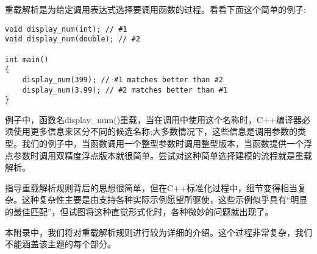 重载解析是为给定调用表达式选择要调用函数的过程。看看下面这个简单的例子:

\begin{lstlisting}[style=styleCXX]
void display_num(int); // #1
void display_num(double); // #2

int main()
{
	display_num(399); // #1 matches better than #2
	display_num(3.99); // #2 matches better than #1
}
\end{lstlisting}

例子中，函数名display\_num()重载，当在调用中使用这个名称时，C++编译器必须使用更多信息来区分不同的候选名称;大多数情况下，这些信息是调用参数的类型。我们的例子中，当函数调用一个整型参数时调用整型版本，当函数提供一个浮点参数时调用双精度浮点版本就很简单。尝试对这种简单选择建模的流程就是重载解析。

指导重载解析规则背后的思想很简单，但在C++标准化过程中，细节变得相当复杂。这种复杂性主要是由支持各种实际示例愿望所驱使，这些示例似乎具有“明显的最佳匹配”，但试图将这种直觉形式化时，各种微妙的问题就出现了。

本附录中，我们将对重载解析规则进行较为详细的介绍。这个过程非常复杂，我们不能涵盖该主题的每个部分。
























